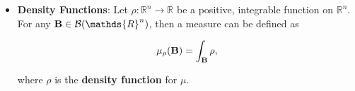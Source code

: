 \documentclass{homework}
\begin{document}
\begin{itemize}
    
    
    \item \textbf{Density Functions}: Let $\rho : \mathds{R}^n \rightarrow \mathds{R}$ be a positive, integrable function on $\mathds{R}^n$. For any ${\bf B} \in \mathcal{B}(\mathds{R}^n)$, then a measure can be defined as
    
    $$
    \mu_{\rho}({\bf B}) = \int_{{\bf B}} \rho,
    $$
    
    where $\rho$ is the \textbf{density function} for $\mu$. \\

\end{itemize}
\end{document}
